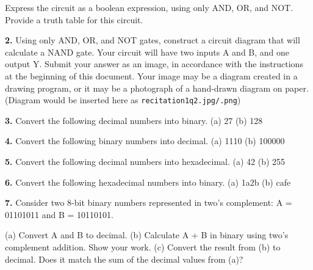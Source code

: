 \documentclass{article}
\begin{document}
Express the circuit as a boolean expression, using only AND, OR, and NOT. Provide a truth table for this circuit.

\vspace{0.5cm}
\noindent\textbf{2.} Using only AND, OR, and NOT gates, construct a circuit diagram that will calculate a NAND gate. Your circuit will have two inputs A and B, and one output Y. Submit your answer as an image, in accordance with the instructions at the beginning of this document. Your image may be a diagram created in a drawing program, or it may be a photograph of a hand-drawn diagram on paper. (Diagram would be inserted here as \texttt{recitation1q2.jpg/.png})

\vspace{0.5cm}
\noindent\textbf{3.} Convert the following decimal numbers into binary.
(a) 27
(b) 128

\vspace{0.5cm}
\noindent\textbf{4.} Convert the following binary numbers into decimal.
(a) 1110
(b) 100000

\vspace{0.5cm}
\noindent\textbf{5.} Convert the following decimal numbers into hexadecimal.
(a) 42
(b) 255

\vspace{0.5cm}
\noindent\textbf{6.} Convert the following hexadecimal numbers into binary.
(a) 1a2b
(b) cafe

\vspace{0.5cm}
\noindent\textbf{7.}  Consider two 8-bit binary numbers represented in two's complement: A = 01101011 and B = 10110101.

(a) Convert A and B to decimal.
(b) Calculate A + B in binary using two's complement addition.  Show your work.
(c) Convert the result from (b) to decimal.  Does it match the sum of the decimal values from (a)?
\end{document}
